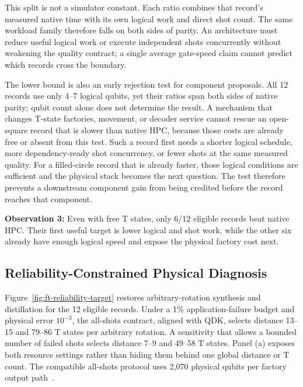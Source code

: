 This split is not a simulator constant. Each ratio combines that record's measured native time with its own logical work and direct shot count. The same workload family therefore falls on both sides of parity. An architecture must reduce useful logical work or execute independent shots concurrently without weakening the quality contract; a single average gate-speed claim cannot predict which records cross the boundary.

The lower bound is also an early rejection test for component proposals. All 12 records use only 4--7 logical qubits, yet their ratios span both sides of native parity; qubit count alone does not determine the result. A mechanism that changes T-state factories, movement, or decoder service cannot rescue an open-square record that is slower than native HPC, because those costs are already free or absent from this test. Such a record first needs a shorter logical schedule, more dependency-ready shot concurrency, or fewer shots at the same measured quality. For a filled-circle record that is already faster, those logical conditions are sufficient and the physical stack becomes the next question. The test therefore prevents a downstream component gain from being credited before the record reaches that component.

\begin{observationbox}
\noindent\textbf{Observation 3:} Even with free T states, only 6/12 eligible records beat native HPC. Their first useful target is lower logical and shot work, while the other six already have enough logical speed and expose the physical factory cost next.
\end{observationbox}
\FloatBarrier

\subsection{Reliability-Constrained Physical Diagnosis}

Figure~\ref{fig:ft-reliability-target} restores arbitrary-rotation synthesis and distillation for the 12 eligible records. Under a 1\% application-failure budget and physical error $10^{-3}$, the all-shots contract, aligned with QDK, selects distance 13--15 and 79--86 T states per arbitrary rotation. A sensitivity that allows a bounded number of failed shots selects distance 7--9 and 49--58 T states. Panel (a) exposes both resource settings rather than hiding them behind one global distance or T count. The compatible all-shots protocol uses 2,070 physical qubits per factory output path~\cite{azureestimator,rossselinger2016}.

